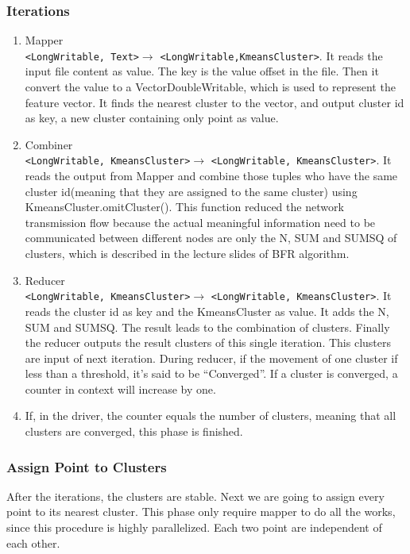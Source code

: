 \documentclass[a4paper,11pt]{article}
\begin{document}
\subsubsection{Iterations}
\begin{enumerate}
  \item Mapper\\\verb|<LongWritable, Text>|$\rightarrow$
  \verb|<LongWritable,KmeansCluster>|. It reads the input file content as value.
  The key is the value offset in the file. Then it convert the value to a
  VectorDoubleWritable, which is used to represent the feature vector. It finds
  the nearest cluster to the vector, and output cluster id as key, a new cluster
  containing only point as value.
  \item Combiner\\\verb|<LongWritable, KmeansCluster>|$\rightarrow$
  \verb|<LongWritable, KmeansCluster>|. It reads the output from Mapper and
  combine those tuples who have the same cluster id(meaning that they are
  assigned to the same cluster) using KmeansCluster.omitCluster(). This function
  reduced the network transmission flow because the actual meaningful
  information need to be communicated between different nodes are only the N,
  SUM and SUMSQ of clusters, which is described in the lecture slides of BFR algorithm.
  \item Reducer\\\verb|<LongWritable, KmeansCluster>|$\rightarrow$
  \verb|<LongWritable, KmeansCluster>|. It reads the cluster id as key and the
  KmeansCluster as value. It adds the N, SUM and SUMSQ. The result leads to the
  combination of clusters. Finally the reducer outputs the result clusters of
  this single iteration. This clusters are input of next iteration. During
  reducer, if the movement of one cluster if less than a threshold, it's said
  to be ``Converged''. If a cluster is converged, a counter in context will
  increase by one.
  \item If, in the driver, the counter equals the number of clusters, meaning
  that all clusters are converged, this phase is finished.
\end{enumerate} 
\subsubsection{Assign Point to Clusters}
After the iterations, the clusters are stable. Next we are going to assign every
point to its nearest cluster. This phase only require mapper to do all the
works, since this procedure is highly parallelized. Each two point are
independent of each other.
\end{document}
